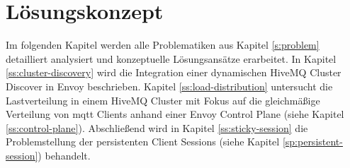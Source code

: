 \section{Lösungskonzept} \label{s:solution}
Im folgenden Kapitel werden alle Problematiken aus Kapitel \ref{s:problem} detailliert analysiert und konzeptuelle Lösungsansätze erarbeitet.
In Kapitel \ref{ss:cluster-discovery} wird die Integration einer dynamischen HiveMQ Cluster Discover in Envoy beschrieben.
Kapitel \ref{ss:load-distribution} untersucht die Lastverteilung in einem HiveMQ Cluster mit Fokus auf die gleichmä{\ss}ige Verteilung von \ac{mqtt} Clients anhand einer Envoy Control Plane (siehe Kapitel \ref{ss:control-plane}).
Abschlie{\ss}end wird in Kapitel \ref{ss:sticky-session} die Problemstellung der persistenten Client Sessions (siehe Kapitel \ref{sp:persistent-session}) behandelt.

